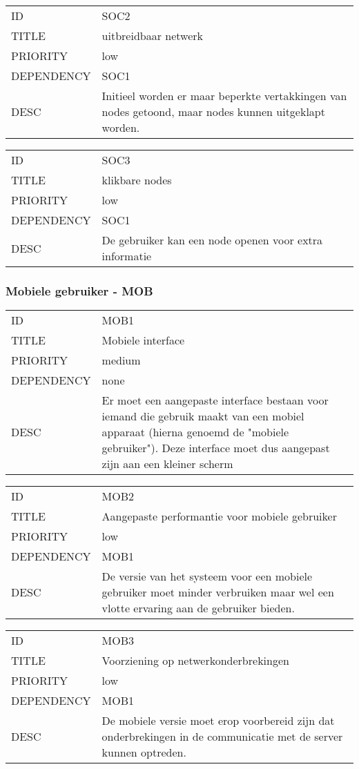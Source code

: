 \begin{longtable}{lp{10cm}}
ID           & SOC2\\
TITLE        & uitbreidbaar netwerk\\
PRIORITY     & low\\
DEPENDENCY   & SOC1\\
DESC         & Initieel worden er maar beperkte vertakkingen van nodes getoond, maar nodes kunnen uitgeklapt worden.     
\end{longtable}

\begin{longtable}{lp{10cm}}
ID           & SOC3\\
TITLE        & klikbare nodes\\
PRIORITY     & low\\
DEPENDENCY   & SOC1\\
DESC         & De gebruiker kan een node openen voor extra informatie     
\end{longtable}

\subsubsection{Mobiele gebruiker - MOB}

\begin{longtable}{lp{10cm}}
ID           & MOB1\\
TITLE        & Mobiele interface\\
PRIORITY     & medium\\
DEPENDENCY   & none\\
DESC         & Er moet een aangepaste interface bestaan voor iemand die gebruik maakt van een mobiel apparaat (hierna genoemd de "mobiele gebruiker"). Deze interface moet dus aangepast zijn aan een kleiner scherm     
\end{longtable}

\begin{longtable}{lp{10cm}}
ID           & MOB2\\
TITLE        & Aangepaste performantie voor mobiele gebruiker\\
PRIORITY     & low\\
DEPENDENCY   & MOB1\\
DESC         & De versie van het systeem voor een mobiele gebruiker moet minder verbruiken maar wel een vlotte ervaring aan de gebruiker bieden.
\end{longtable}

\begin{longtable}{lp{10cm}}
ID           & MOB3\\
TITLE        & Voorziening op netwerkonderbrekingen\\
PRIORITY     & low\\
DEPENDENCY   & MOB1\\
DESC         & De mobiele versie moet erop voorbereid zijn dat onderbrekingen in de communicatie met de server kunnen optreden.
\end{longtable}

